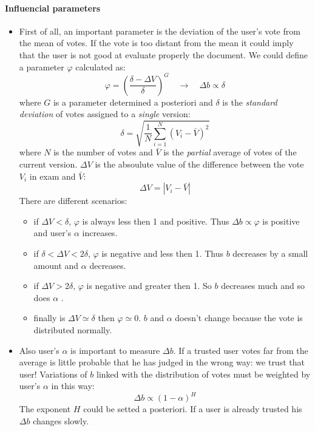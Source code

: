 \documentclass[a4paper,11pt]{article}
\newcommand{\al}{$\alpha$ }
\begin{document}
\paragraph{Influencial parameters}
\begin{itemize}
\item First of all, an important parameter is the deviation of the user's vote from the mean of votes. If the vote is too distant from the mean it could imply that the user is not good at evaluate properly the document. We could define a parameter $\varphi$ calculated as:
\begin{equation}
\varphi = \left(\frac{\delta - \Delta V}{\delta}\right)^G \quad \longrightarrow \quad \Delta b \propto \delta
\end{equation}
where $G$ is a parameter determined a posteriori and $\delta$ is the \emph{standard deviation} of votes assigned to a \emph{single} version:
\begin{equation}
\delta = \sqrt{ \frac{1}{N} \sum_{i=1}^N \left(V_i - \bar{V}\right)^2} 
\end{equation}
where $N$ is the number of votes and $\bar{V}$ is the \emph{partial} average of votes of the current version. $\Delta V$ is the absoulute value of the difference between the vote $V_i$ in exam and $\bar{V}$:
\begin{equation}
\Delta V = | V_i - \bar{V}|
\end{equation}
There are different scenarios:
\begin{itemize}
\item if $\Delta V < \delta$, $\varphi$ is always less then 1 and positive. Thus $\Delta b\propto \varphi$ is positive and user's \al increases.
\item if $\delta < \Delta V < 2\delta$, $\varphi$ is negative and less then 1. Thus $b$ decreases by a small amount and \al decreases.
\item if $\Delta V > 2\delta$, $\varphi$ is negative and greater then 1. So $b$ decreases much and so does \al.
\item finally is $\Delta V \simeq \delta$ then $\varphi \simeq 0$. $b$ and \al doesn't change because the vote is distributed normally.
\end{itemize}

\item Also user's \al is important to measure $\Delta b$. If a trusted user votes far from the average is little probable that he has judged in the wrong way: we trust that user! Variations of $b$ linked with the distribution of votes must be weighted by user's \al in this way:
\begin{equation}
\Delta b \propto \left(1- \alpha\right)^H
\end{equation}
The exponent $H$ could be setted a posteriori. If a user is already trusted his $\Delta b$ changes slowly. 
\end{itemize}
\end{document}
